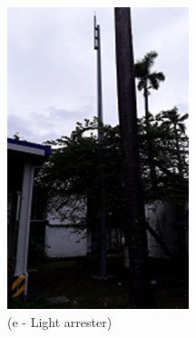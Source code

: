 \begin{figure}[!h]
	\hspace{0.03cm}
	\begin{minipage}[b]{0.22\linewidth}
		\includegraphics[width=\textwidth]{figures/fig_ch04_elecaudit_visualinspection_lightarrester}
		\caption*{(e - Light arrester)}
	\end{minipage}
	\hspace{0.03cm}
	\begin{minipage}[b]{0.22\linewidth}

\end{minipage}
\end{figure}

